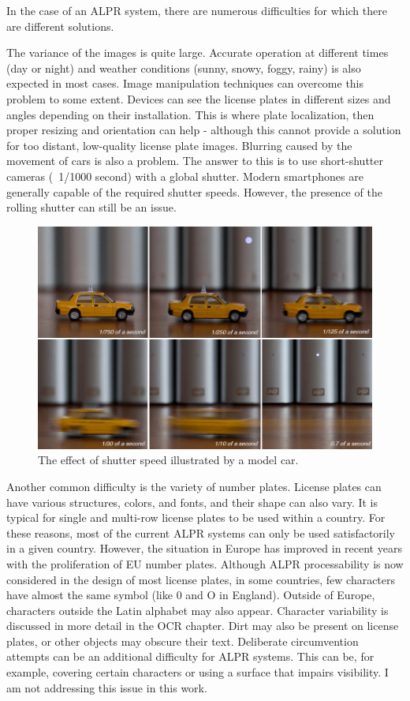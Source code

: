 In the case of an ALPR system, there are numerous difficulties for which there are different solutions.

The variance of the images is quite large. Accurate operation at different times (day or night) and weather conditions (sunny, snowy, foggy, rainy) is also expected in most cases. Image manipulation techniques can overcome this problem to some extent. Devices can see the license plates in different sizes and angles depending on their installation. This is where plate localization, then proper resizing and orientation can help - although this cannot provide a solution for too distant, low-quality license plate images. Blurring caused by the movement of cars is also a problem. The answer to this is to use short-shutter cameras (~1/1000 second) with a global shutter. Modern smartphones are generally capable of the required shutter speeds. However, the presence of the rolling shutter can still be an issue.

\begin{figure}[htb]
 \centerline{\includegraphics[width=1.0\columnwidth]{.//Figure/ALPR/shutter-speed.png}}
 \caption{The effect of shutter speed illustrated by a model car\cite{ShutterEffect}.}
 \label{fig:simple}
\end{figure}

Another common difficulty is the variety of number plates. License plates can have various structures, colors, and fonts, and their shape can also vary. It is typical for single and multi-row license plates to be used within a country. For these reasons, most of the current ALPR systems can only be used satisfactorily in a given country. However, the situation in Europe has improved in recent years with the proliferation of EU number plates. Although ALPR processability is now considered in the design of most license plates, in some countries, few characters have almost the same symbol (like 0 and O in England). Outside of Europe, characters outside the Latin alphabet may also appear. Character variability is discussed in more detail in the OCR chapter. Dirt may also be present on license plates, or other objects may obscure their text. Deliberate circumvention attempts can be an additional difficulty for ALPR systems. This can be, for example, covering certain characters or using a surface that impairs visibility. I am not addressing this issue in this work.

